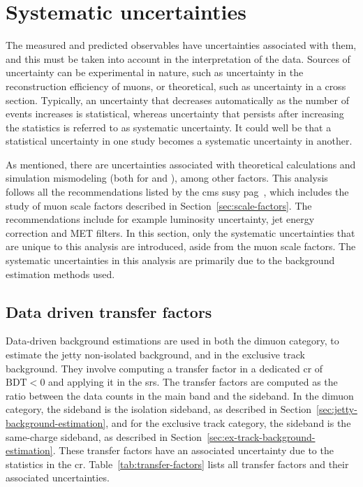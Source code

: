 \clearpage
\section{Systematic uncertainties}
\label{sec:systematic-uncertainties}

The measured and predicted observables have uncertainties associated with them, and this must be taken into account in the interpretation of the data. Sources of uncertainty can be experimental in nature, such as uncertainty in the reconstruction efficiency of muons, or theoretical, such as uncertainty in a cross section. Typically, an uncertainty that decreases automatically as the number of events increases is statistical, whereas uncertainty that persists after increasing the statistics is referred to as systematic uncertainty. It could well be that a statistical uncertainty in one study becomes a systematic uncertainty in another.

As mentioned, there are uncertainties associated with theoretical calculations and simulation mismodeling (both for \FASTSIM and \FULLSIM), among other factors. This analysis follows all the recommendations listed by the \gls{cms} \gls{susy} \gls{pag}~\cite{sus-pag-recommendations}, which includes the study of muon scale factors described in Section~\ref{sec:scale-factors}. The recommendations include for example luminosity uncertainty, jet energy correction and MET filters. In this section, only the systematic uncertainties that are unique to this analysis are introduced, aside from the muon scale factors. The systematic uncertainties in this analysis are primarily due to the background estimation methods used.

\subsection{Data driven transfer factors}
\label{sec:data-driven-tranfer-factors}

Data-driven background estimations are used in both the dimuon category, to estimate the jetty non-isolated background, and in the exclusive track background. They involve computing a transfer factor in a dedicated \gls{cr} of $\text{BDT}<0$ and applying it in the \glspl{sr}. The transfer factors are computed as the ratio between the data counts in the main band and the sideband. In the dimuon category, the sideband is the isolation sideband, as described in Section~\ref{sec:jetty-background-estimation}, and for the exclusive track category, the sideband is the same-charge sideband, as described in Section~\ref{sec:ex-track-background-estimation}. These transfer factors have an associated uncertainty due to the statistics in the \gls{cr}. Table~\ref{tab:transfer-factors} lists all transfer factors and their associated uncertainties.

